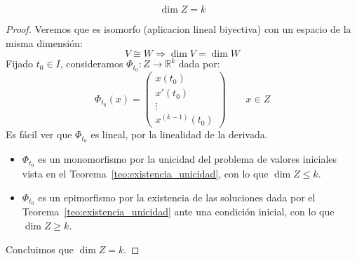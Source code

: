 \begin{teo}
    \begin{equation*}
        \dim Z = k
    \end{equation*}
    \begin{proof}
        Veremos que es isomorfo (aplicacion lineal biyectiva) con un espacio de la misma dimensión:
        \begin{equation*}
            V\cong W \Longrightarrow \dim V = \dim W
        \end{equation*}
        Fijado $t_0\in I$, consideramos $\Phi_{t_0}:Z\rightarrow \mathbb{R}^k$ dada por:
        \begin{equation*}
            \Phi_{t_0}(x) = \left(\begin{array}{c}
                x(t_0) \\
                x'(t_0) \\
                \vdots \\
                x^{(k-1)}(t_0)
            \end{array}\right) \qquad x\in Z
        \end{equation*}
        Es fácil ver que $\Phi_{t_0}$ es lineal, por la linealidad de la derivada.\\

        \begin{itemize}
            \item $\Phi_{t_0}$ es un monomorfismo por la unicidad del problema de valores iniciales vista en el Teorema~\ref{teo:existencia_unicidad}, con lo que $\dim Z \leq k$.
            \item $\Phi_{t_0}$ es un epimorfismo por la existencia de las soluciones dada por el Teorema~\ref{teo:existencia_unicidad} ante una condición inicial, con lo que $\dim Z \geq k$.
        \end{itemize}
        Concluimos que $\dim Z = k$.
    \end{proof}
\end{teo}


